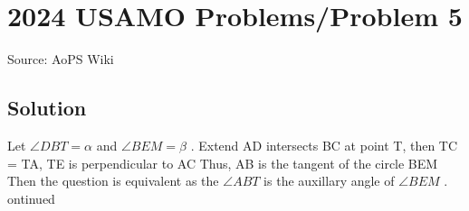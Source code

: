 \documentclass[12pt]{article}
\begin{document}
\section*{{2024 USAMO Problems/Problem 5}}
Source: AoPS Wiki

\subsection*{Solution}
Let $\angle DBT = \alpha$ and $\angle BEM = \beta$ .
Extend AD intersects BC at point T, then TC = TA, TE is perpendicular to AC Thus, AB is the tangent of the circle BEM Then the question is equivalent as the $\angle ABT$ is the auxillary angle of $\angle BEM$ . ontinued
\end{document}
